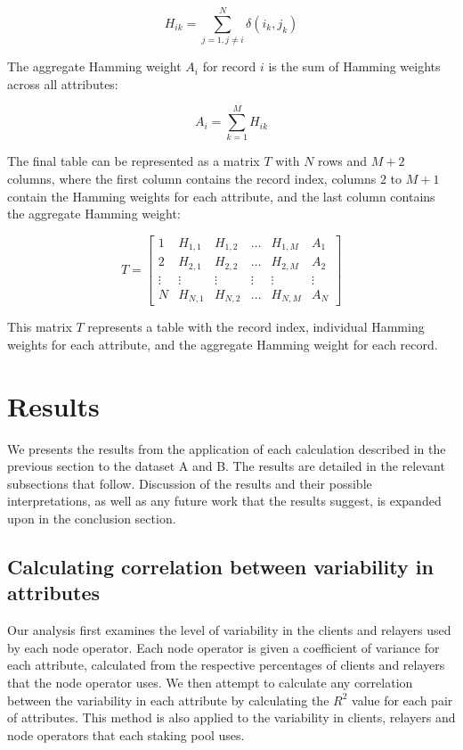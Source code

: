 \documentclass[conference]{IEEEtran}
\begin{document}
\[ H_{ik} = \sum_{j=1, j\neq i}^{N} \delta \left( i_k,j_k \right) \]

The aggregate Hamming weight \( A_{i} \) for record \( i \) is the sum of Hamming weights across all attributes:

\[ A_{i} = \sum_{k=1}^{M} H_{ik} \]

The final table can be represented as a matrix \( T \) with \( N \) rows and \( M+2 \) columns, where the first column contains the record index, columns \( 2 \) to \( M+1 \) contain the Hamming weights for each attribute, and the last column contains the aggregate Hamming weight:

\[ T = \begin{bmatrix} 
1 & H_{1,1} & H_{1,2} & \ldots & H_{1,M} & A_{1} \\
2 & H_{2,1} & H_{2,2} & \ldots & H_{2,M} & A_{2} \\
\vdots & \vdots & \vdots & \vdots & \vdots & \vdots \\
N & H_{N,1} & H_{N,2} & \ldots & H_{N,M} & A_{N}
\end{bmatrix} \]

\vspace{2pt}

This matrix \( T \) represents a table with the record index, individual Hamming weights for each attribute, and the aggregate Hamming weight for each record.

\section{Results}

We presents the results from the application of each calculation described in the previous section to the dataset A and B.  The results are detailed in the relevant subsections that follow.  Discussion of the results and their possible interpretations, as well as any future work that the results suggest, is expanded upon in the conclusion section.

\subsection{Calculating correlation between variability in attributes}

Our analysis first examines the level of variability in the clients and relayers used by each node operator.  Each node operator is given a coefficient of variance for each attribute, calculated from the respective percentages of clients and relayers that the node operator uses. We then attempt to calculate any correlation between the variability in each attribute by calculating the $R^2$ value for each pair of attributes.  This method is also applied to the variability in clients, relayers and node operators that each staking pool uses.
\end{document}
